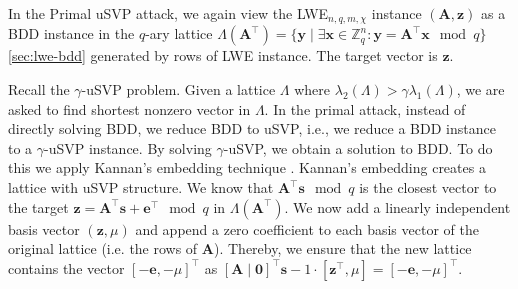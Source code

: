

In the Primal uSVP attack, we again view the LWE$_{n, q, m, \chi}$ instance $(\mathbf{A}, \mathbf{z})$ as a BDD instance in the  $q$-ary lattice $\Lambda(\mathbf{A}^\intercal) = \{ \mathbf{y} \mid \exists \mathbf{x} \in \mathbb{Z}_q^n : \mathbf{y} = \mathbf{A}^\intercal \mathbf{x}  \mod q \}$ \cref{sec:lwe-bdd} generated by rows of LWE instance. The target vector is $\mathbf{z}$. %

Recall the $\gamma$-uSVP problem. Given a lattice $\Lambda$ where $\lambda_2(\Lambda) > \gamma \lambda_1(\Lambda)$, we are asked to find shortest nonzero vector in $\Lambda$.
In the primal attack, instead of directly solving BDD, we reduce BDD to uSVP, i.e., we reduce a BDD instance to a $\gamma$-uSVP instance. By solving $\gamma$-uSVP, we obtain a solution to BDD.
To do this we apply Kannan's embedding technique \cite{Kan87}. %
Kannan's embedding creates a lattice with uSVP structure. We know that $\mathbf{A}^\intercal \mathbf{s}\mod q$ is the closest vector to the target $\mathbf{z} =\mathbf{A}^\intercal \mathbf{s} + \mathbf{e}^\intercal \mod q$ in $\Lambda(\mathbf{A}^\intercal)$. We now add a linearly independent basis vector  $(\mathbf{z}, \mu)$ and append a zero coefficient to each basis vector of the original lattice (i.e. the rows of $\mathbf{A}$). Thereby, we ensure that the new lattice contains the vector $[-\mathbf{e}, -\mu]^\intercal$ as $[\mathbf{A} \mid \mathbf{0}]^\intercal \mathbf{s} - 1 \cdot [\mathbf{z}^\intercal, \mu] = [-\mathbf{e}, -\mu]^\intercal$.

